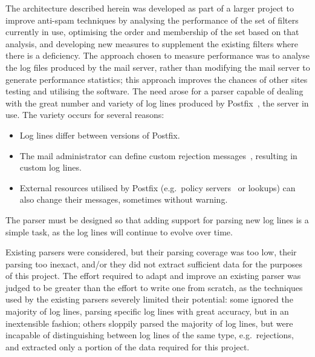 \documentclass[draft]{svmult}
\begin{document}
The architecture described herein was developed as part of a larger project
to improve anti-spam techniques by analysing the performance of the set of
filters currently in use, optimising the order and membership of the set
based on that analysis, and developing new measures to supplement the
existing filters where there is a deficiency.  The approach chosen to
measure performance was to analyse the log files produced by the mail
server, rather than modifying the mail server to generate performance
statistics; this approach improves the chances of other sites testing and
utilising the software.  The need arose for a parser capable of dealing
with the great number and variety of log lines produced by
Postfix~\cite{postfix}, the \SMTP{} server in use.  The variety occurs for
several reasons:

\begin{itemize}

    \item Log lines differ between versions of Postfix.
        
    \item The mail administrator can define custom rejection
        messages~\cite{postfix-lookup-tables, smtpd_access_readme,
        smtpd_per_user_control}, resulting in custom log lines.

    \item External resources utilised by Postfix (e.g.\ policy
        servers~\cite{policy-servers} or \DNSBL{} lookups) can also change
        their messages, sometimes without warning.

\end{itemize}

The parser must be designed so that adding support for parsing new log
lines is a simple task, as the log lines will continue to evolve over time.

Existing parsers were considered, but their parsing coverage was too low,
their parsing too inexact, and/or they did not extract sufficient data for
the purposes of this project.  The effort required to adapt and improve an
existing parser was judged to be greater than the effort to write one from
scratch, as the techniques used by the existing parsers severely limited
their potential: some ignored the majority of log lines, parsing specific
log lines with great accuracy, but in an inextensible fashion; others
sloppily parsed the majority of log lines, but were incapable of
distinguishing between log lines of the same type, e.g.\ rejections, and
extracted only a portion of the data required for this project.
\end{document}
